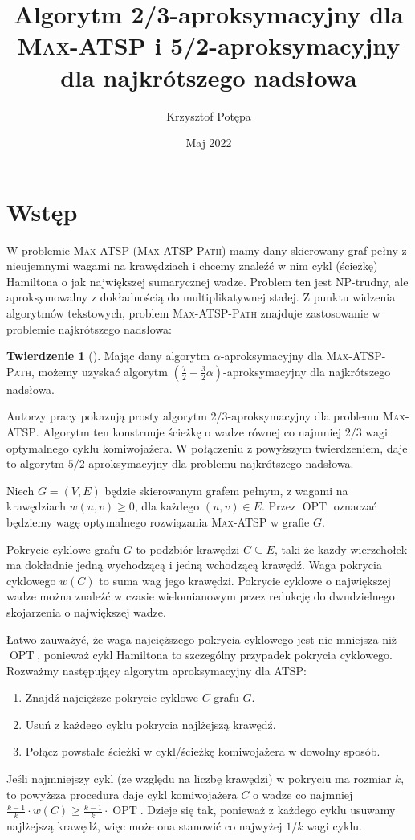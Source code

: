 \documentclass[a4paper,12pt]{article}
\title{Algorytm 2/3-aproksymacyjny dla \textsc{Max-ATSP} i 5/2-aproksymacyjny dla najkrótszego nadsłowa}
\author{Krzysztof Potępa}
\date{Maj 2022}
\DeclareMathOperator\OPT{OPT}
\theoremstyle{definition}
\newtheorem{theorem}{Twierdzenie}
\begin{document}
\maketitle

\section{Wstęp}

W problemie \textsc{Max-ATSP} (\textsc{Max-ATSP-Path}) mamy dany skierowany graf pełny z nieujemnymi wagami na krawędziach i chcemy znaleźć w nim cykl (ścieżkę) Hamiltona o jak największej sumarycznej wadze. Problem ten jest NP-trudny, ale aproksymowalny z dokładnością do multiplikatywnej stałej. Z punktu widzenia algorytmów tekstowych, problem \textsc{Max-ATSP-Path} znajduje zastosowanie w problemie najkrótszego nadsłowa:
\begin{theorem}[\cite{Breslauer1997,Mucha2007}]
  Mając dany algorytm $\alpha$-aproksymacyjny dla \textsc{Max-ATSP-Path}, możemy uzyskać algorytm $\left(\frac{7}{2}-\frac{3}{2}\alpha\right)$-aproksymacyjny dla najkrótszego nadsłowa.
\end{theorem}
Autorzy pracy \cite{Paluch2012} pokazują prosty algorytm 2/3-aproksymacyjny dla problemu \textsc{Max-ATSP}. Algorytm ten konstruuje ścieżkę o wadze równej co najmniej $2/3$ wagi optymalnego cyklu komiwojażera. W połączeniu z powyższym twierdzeniem, daje to algorytm $5/2$-aproksymacyjny dla problemu najkrótszego nadsłowa.

Niech $G = (V, E)$ będzie skierowanym grafem pełnym, z wagami na krawędziach $w(u, v) \geq 0$, dla każdego $(u, v) \in E$. Przez $\OPT$ oznaczać będziemy wagę optymalnego rozwiązania \textsc{Max-ATSP} w grafie $G$.

Pokrycie cyklowe grafu $G$ to podzbiór krawędzi $C \subseteq E$, taki że każdy wierzchołek ma dokładnie jedną wychodzącą i jedną wchodzącą krawędź. Waga pokrycia cyklowego $w(C)$ to suma wag jego krawędzi. Pokrycie cyklowe o największej wadze można znaleźć w czasie wielomianowym przez redukcję do dwudzielnego skojarzenia o największej wadze.

Łatwo zauważyć, że waga najcięższego pokrycia cyklowego jest nie mniejsza niż $\OPT$, ponieważ cykl Hamiltona to szczególny przypadek pokrycia cyklowego. Rozważmy następujący algorytm aproksymacyjny dla ATSP:
\begin{enumerate}[noitemsep]
  \item Znajdź najcięższe pokrycie cyklowe $C$ grafu $G$.
  \item Usuń z każdego cyklu pokrycia najlżejszą krawędź.
  \item Połącz powstałe ścieżki w cykl/ścieżkę komiwojażera w dowolny sposób.
\end{enumerate}
Jeśli najmniejszy cykl (ze względu na liczbę krawędzi) w pokryciu ma rozmiar $k$, to powyższa procedura daje cykl komiwojażera $C$ o wadze co najmniej $\frac{k-1}{k} \cdot w(C) \geq \frac{k-1}{k} \cdot \OPT$. Dzieje się tak, ponieważ z każdego cyklu usuwamy najlżejszą krawędź, więc może ona stanowić co najwyżej $1/k$ wagi cyklu.
\end{document}
